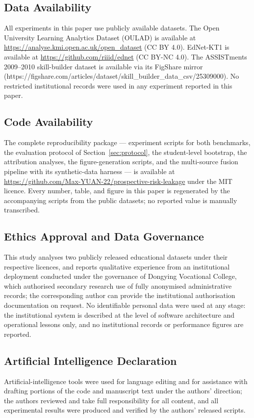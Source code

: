 \documentclass[sn-mathphys,Numbered]{sn-jnl}
\begin{document}
\subsection*{Data Availability}
All experiments in this paper use publicly available datasets. The Open University Learning Analytics Dataset (OULAD) \cite{Kuzilek2017} is available at \url{https://analyse.kmi.open.ac.uk/open_dataset} (CC BY 4.0). EdNet-KT1 \cite{Choi2020} is available at \url{https://github.com/riiid/ednet} (CC BY-NC 4.0). The ASSISTments 2009--2010 skill-builder dataset \cite{Feng2009} is available via its FigShare mirror (https://figshare.com/articles/dataset/skill\_builder\_data\_csv/25309000). No restricted institutional records were used in any experiment reported in this paper.

\subsection*{Code Availability}
The complete reproducibility package --- experiment scripts for both benchmarks, the evaluation protocol of Section~\ref{sec:protocol}, the student-level bootstrap, the attribution analyses, the figure-generation scripts, and the multi-source fusion pipeline with its synthetic-data harness --- is available at \url{https://github.com/Max-YUAN-22/prospective-risk-leakage} under the MIT licence. Every number, table, and figure in this paper is regenerated by the accompanying scripts from the public datasets; no reported value is manually transcribed.

\subsection*{Ethics Approval and Data Governance}
This study analyses two publicly released educational datasets under their respective licences, and reports qualitative experience from an institutional deployment conducted under the governance of Dongying Vocational College, which authorised secondary research use of fully anonymised administrative records; the corresponding author can provide the institutional authorisation documentation on request. No identifiable personal data were used at any stage: the institutional system is described at the level of software architecture and operational lessons only, and no institutional records or performance figures are reported.

\subsection*{Artificial Intelligence Declaration}
Artificial-intelligence tools were used for language editing and for assistance with drafting portions of the code and manuscript text under the authors' direction; the authors reviewed and take full responsibility for all content, and all experimental results were produced and verified by the authors' released scripts.
\end{document}
